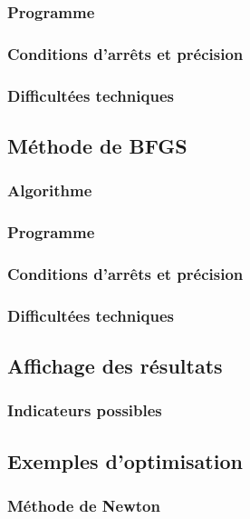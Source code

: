 \documentclass[3p, twocolumn]{elsarticle}
\begin{document}
\subsubsection{Programme}
\subsubsection{Conditions d'arrêts et précision}
\subsubsection{Difficultées techniques}
\subsection{Méthode de BFGS}
\subsubsection{Algorithme}
\subsubsection{Programme}
\subsubsection{Conditions d'arrêts et précision}
\subsubsection{Difficultées techniques}
\subsection{Affichage des résultats}
\subsubsection{Indicateurs possibles}
\subsection{Exemples d'optimisation}
\subsubsection{Méthode de Newton}
\end{document}
